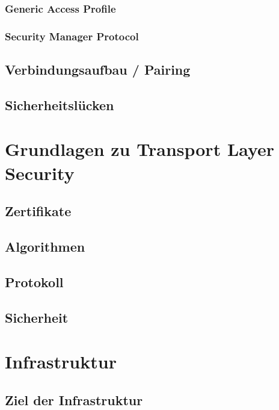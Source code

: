 \documentclass[doktyp=barbeit]{TUBAFarbeiten}
\begin{document}
		\subsubsection{Generic Access Profile}
			

		\subsubsection{Security Manager Protocol}
			

	\subsection{Verbindungsaufbau / Pairing}

	\subsection{Sicherheitslücken}

\newpage
\section{Grundlagen zu Transport Layer Security}

	\subsection{Zertifikate}

	\subsection{Algorithmen}

	\subsection{Protokoll}

	\subsection{Sicherheit}

\newpage
\section{Infrastruktur}

	\subsection{Ziel der Infrastruktur}
		
\end{document}
